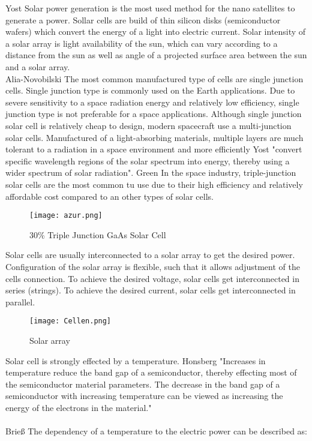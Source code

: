 Yost\cite{1} Solar power generation is the most used method for the nano satellites to generate a power. Sollar cells are build of thin silicon disks (semiconductor wafers)  which convert the energy of a light into electric current. Solar intensity of a solar array is light availability of the sun, which can vary according to a distance from the sun as well as angle of a projected surface area between the sun and a solar array.  
\\
\noindent\hspace*{3mm} Alia-Novobilski\cite{2} The most common manufactured type of cells are single junction cells. Single junction type is commonly used on the Earth applications. Due to severe sensitivity to a space radiation energy and relatively low efficiency, single junction type is not preferable for a space applications. Although single junction solar cell is relatively cheap to design, modern spacecraft use a multi-junction solar cells. Manufactured of a light-absorbing materials, multiple layers are much tolerant to a radiation in a space environment and more efficiently  Yost\cite{1} "convert specific wavelength regions of the solar spectrum into energy, thereby using a wider spectrum of solar radiation". 
Green\cite{3} In the space industry, triple-junction solar cells are the most common tu use due to their high efficiency and relatively affordable cost compared to an other types of solar cells. 

\begin{figure}[h]
	\centering
	\texttt{[image: azur.png]}
	\caption{ 30\% Triple Junction GaAs Solar Cell \cite{4}}
	\label{fig: EPS}
\end{figure}

Solar cells are usually interconnected to a solar array to get the desired power. Configuration of the solar array is flexible, such that it allows adjustment of the cells connection. To achieve the desired voltage, solar cells get interconnected in series (strings). To achieve the desired current, solar cells get interconnected in parallel.\\

\newpage

\begin{figure}[h]
	\centering
	\texttt{[image: Cellen.png]}
	\caption{ Solar array}
	\label{fig: EPS}
\end{figure}
	
Solar cell is strongly effected by a temperature. Honsberg\cite{5} "Increases in temperature reduce the band gap of a semiconductor, thereby effecting most of the semiconductor material parameters. The decrease in the band gap of a semiconductor with increasing temperature can be viewed as increasing the energy of the electrons in the material."\\
\\
Brieß\cite{6} The dependency of a temperature to the electric power can be described as:\\ \\ \\

